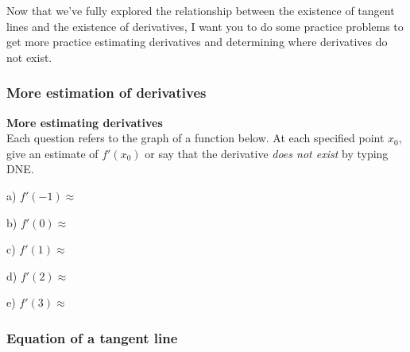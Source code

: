 \documentclass[pdftex, brazil, 12pt, twoside]{article}
\begin{document}
Now that we've fully explored the relationship
between the existence of tangent lines
and the existence of derivatives,
I want you to do some practice problems to get more practice
estimating derivatives and determining
where derivatives do not exist.

\subsubsection{More estimation of derivatives}
\label{u1-geometric-more-estimating-derivatives}

\begin{exercise}
  \textbf{More estimating derivatives}\\%
  Each question refers to the graph of a function below. At each specified point
  $x_0$, give an estimate of $f'(x_0)$ or say that the derivative \emph{does not exist}
  by typing DNE.
  \begin{figure}[H]
    \begin{center}
    \end{center}
  \end{figure}
  a) $f'(-1) \approx$

  b) $f'(0) \approx$

  c) $f'(1) \approx$

  d) $f'(2) \approx$

  e) $f'(3) \approx$
\end{exercise}

\subsubsection{Equation of a tangent line}
\label{u1-geometric-equation-of-tangent}
\end{document}

